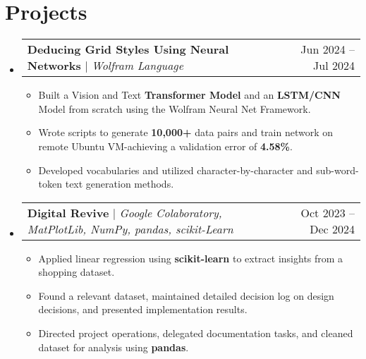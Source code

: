 \documentclass[letterpaper,11pt]{article} %
\makeatletter
\newcommand{\resumeItem}[1]{
  \item\small{
    {#1 \vspace{-4pt}}
  }
}
\newcommand{\resumeProjectHeading}[2]{
    \item
    \begin{tabular*}{0.97\textwidth}{l@{\extracolsep{\fill}}r}
      \small#1 & #2 \\
    \end{tabular*}\vspace{-7pt}
}
\newcommand{\resumeSubHeadingListStart}{\begin{itemize}[leftmargin=0.15in, label={}]}
\newcommand{\resumeSubHeadingListEnd}{\end{itemize}}
\newcommand{\resumeItemListStart}{\begin{itemize}}
\newcommand{\resumeItemListEnd}{\end{itemize}\vspace{-5pt}}
\makeatother
\begin{document}
\section{Projects}
    \resumeSubHeadingListStart
      \resumeProjectHeading
          {\textbf{Deducing Grid Styles Using Neural Networks} $|$ \emph{Wolfram Language}}{Jun 2024 -- Jul 2024}
          \resumeItemListStart
            \resumeItem{Built a Vision and Text \textbf{Transformer Model} and an \textbf{LSTM/CNN} Model from scratch using the Wolfram Neural Net Framework.}
            \resumeItem{Wrote scripts to generate \textbf{10,000+} data pairs and train network on remote Ubuntu VM-achieving a validation error of \textbf{4.58\%}.}
            \resumeItem{Developed vocabularies and utilized character-by-character and sub-word-token text generation methods.}
          \resumeItemListEnd
      \resumeProjectHeading
          {\textbf{Digital Revive} $|$ \emph{Google Colaboratory, MatPlotLib, NumPy, pandas, scikit-Learn}}{Oct 2023 -- Dec 2024}
          \resumeItemListStart
            \resumeItem{Applied linear regression using \textbf{scikit-learn} to extract insights from a shopping dataset.}
            \resumeItem{Found a relevant dataset, maintained detailed decision log on design decisions, and presented implementation results.}
            \resumeItem{Directed project operations, delegated documentation tasks, and cleaned dataset for analysis using \textbf{pandas}.}
            
          \resumeItemListEnd
    \resumeSubHeadingListEnd



\end{document}
